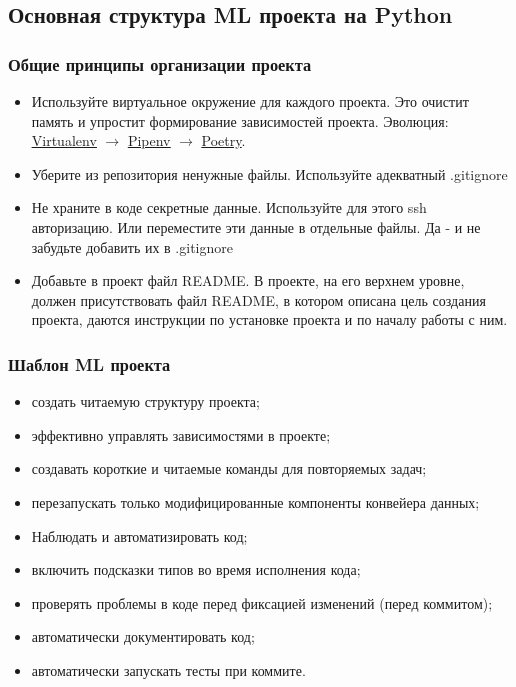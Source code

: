 \subsection{Основная структура ML проекта на Python}
\subsubsection{Общие принципы организации проекта}
\begin{itemize}
	\item Используйте виртуальное окружение для каждого проекта. Это очистит память и упростит формирование зависимостей проекта. \linebreak Эволюция: \href{https://virtualenv.pypa.io/en/latest/}{\underline{Virtualenv}} $\to$ \href{https://pipenv.pypa.io/en/latest/}{\underline{Pipenv}} $\to$ \href{https://python-poetry.org}{\underline{Poetry}}.
	\item Уберите из репозитория ненужные файлы. Используйте адекватный .gitignore
	\item Не храните в коде секретные данные. Используйте для этого ssh авторизацию. Или переместите эти данные в отдельные файлы. Да - и не забудьте добавить их в .gitignore
	\item Добавьте в проект файл README. В проекте, на его верхнем уровне, должен присутствовать файл README, в котором описана цель создания проекта, даются инструкции по установке проекта и по началу работы с ним.
\end{itemize}

\subsubsection{Шаблон ML проекта}
\begin{itemize}
	\item создать читаемую структуру проекта;
	\item эффективно управлять зависимостями в проекте;
	\item создавать короткие и читаемые команды для повторяемых задач;
	\item перезапускать только модифицированные компоненты конвейера данных;
	\item Наблюдать и автоматизировать код;
	\item включить подсказки типов во время исполнения кода;
	\item проверять проблемы в коде перед фиксацией изменений (перед коммитом);
	\item автоматически документировать код;
	\item автоматически запускать тесты при коммите.
\end{itemize}

